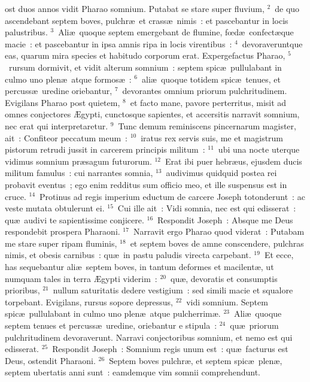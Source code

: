 \bchapter
{}ost duos annos vidit Pharao somnium. Putabat se stare super fluvium,
${}^{2}$~de quo ascendebant septem boves, pulchr\ae\ et crass\ae\ nimis~: et pascebantur in locis palustribus.
${}^{3}$~Ali\ae\ quoque septem emergebant de flumine, fœd\ae\ confect\ae que macie~: et pascebantur in ipsa amnis ripa in locis virentibus~:
${}^{4}$~devoraveruntque eas, quarum mira species et habitudo corporum erat. Expergefactus Pharao,
${}^{5}$~rursum dormivit, et vidit alterum somnium~: septem spic\ae\ pullulabant in culmo uno plen\ae\ atque formos\ae~:
${}^{6}$~ali\ae\ quoque totidem spic\ae\ tenues, et percuss\ae\ uredine oriebantur,
${}^{7}$~devorantes omnium priorum pulchritudinem. Evigilans Pharao post quietem,
${}^{8}$~et facto mane, pavore perterritus, misit ad omnes conjectores \AE gypti, cunctosque sapientes, et accersitis narravit somnium, nec erat qui interpretaretur.
${}^{9}$~Tunc demum reminiscens pincernarum magister, ait~: Confiteor peccatum meum~:
${}^{10}$~iratus rex servis suis, me et magistrum pistorum retrudi jussit in carcerem principis militum~:
${}^{11}$~ubi una nocte uterque vidimus somnium pr\ae sagum futurorum.
${}^{12}$~Erat ibi puer hebr\ae us, ejusdem ducis militum famulus~: cui narrantes somnia,
${}^{13}$~audivimus quidquid postea rei probavit eventus~; ego enim redditus sum officio meo, et ille suspensus est in cruce.
${}^{14}$~Protinus ad regis imperium eductum de carcere Joseph totonderunt~: ac veste mutata obtulerunt ei.
${}^{15}$~Cui ille ait~: Vidi somnia, nec est qui edisserat~: qu\ae\ audivi te sapientissime conjicere.
${}^{16}$~Respondit Joseph~: Absque me Deus respondebit prospera Pharaoni.
${}^{17}$~Narravit ergo Pharao quod viderat~: Putabam me stare super ripam fluminis,
${}^{18}$~et septem boves de amne conscendere, pulchras nimis, et obesis carnibus~: qu\ae\ in pastu paludis virecta carpebant.
${}^{19}$~Et ecce, has sequebantur ali\ae\ septem boves, in tantum deformes et macilent\ae , ut numquam tales in terra \AE gypti viderim~:
${}^{20}$~qu\ae , devoratis et consumptis prioribus,
${}^{21}$~nullum saturitatis dedere vestigium~: sed simili macie et squalore torpebant. Evigilans, rursus sopore depressus,
${}^{22}$~vidi somnium. Septem spic\ae\ pullulabant in culmo uno plen\ae\ atque pulcherrim\ae .
${}^{23}$~Ali\ae\ quoque septem tenues et percuss\ae\ uredine, oriebantur e stipula~:
${}^{24}$~qu\ae\ priorum pulchritudinem devoraverunt. Narravi conjectoribus somnium, et nemo est qui edisserat.
${}^{25}$~Respondit Joseph~: Somnium regis unum est~: qu\ae\ facturus est Deus, ostendit Pharaoni.
${}^{26}$~Septem boves pulchr\ae , et septem spic\ae\ plen\ae , septem ubertatis anni sunt~: eamdemque vim somnii comprehendunt.
